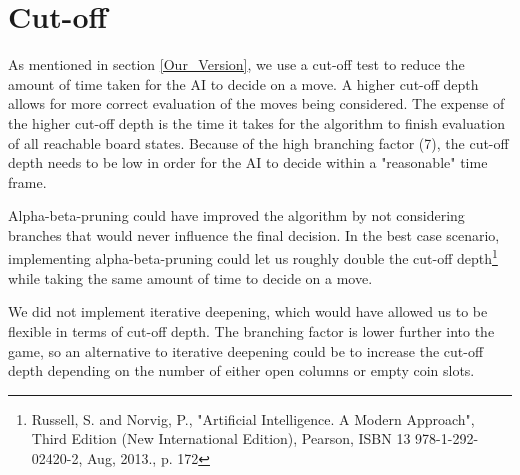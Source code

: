 \section{Cut-off}
\label{Cutoff}
As mentioned in section \ref{Our_Version}, we use a cut-off test to reduce the amount of time taken for the AI to decide on a move. A higher cut-off depth allows for more correct evaluation of the moves being considered. The expense of the higher cut-off depth is the time it takes for the algorithm to finish evaluation of all reachable board states. Because of the high branching factor (7), the cut-off depth needs to be low in order for the AI to decide within a "reasonable" time frame.

Alpha-beta-pruning could have improved the algorithm by not considering branches that would never influence the final decision. In the best case scenario, implementing alpha-beta-pruning could let us roughly double the cut-off depth\footnote{Russell, S. and Norvig, P., "Artificial Intelligence. A Modern Approach", Third Edition (New International Edition), Pearson, ISBN 13 978-1-292-02420-2, Aug, 2013., p. 172} while taking the same amount of time to decide on a move.

We did not implement iterative deepening, which would have allowed us to be flexible in terms of cut-off depth. The branching factor is lower further into the game, so an alternative to iterative deepening could be to increase the cut-off depth depending on the number of either open columns or empty coin slots.